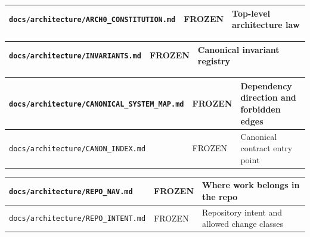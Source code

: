 \documentclass[9pt,a4paper,openany]{book}
\newcommand{\toprule}{\hline}
\newcommand{\midrule}{\hline}
\newcommand{\bottomrule}{\hline}
\begin{document}
\begin{center}
{\small\renewcommand{\arraystretch}{1.18}
\begin{tabularx}{\linewidth}{@{}>{\raggedright\arraybackslash}X >{\raggedright\arraybackslash}X >{\raggedright\arraybackslash}X@{}}
\toprule
\textbf{\texttt{docs/\allowbreak{}architecture/\allowbreak{}ARCH0\_\allowbreak{}CONSTITUTION.\allowbreak{}md}} & \textbf{FROZEN} & \textbf{Top-\allowbreak{}level architecture law} \\
\midrule
\bottomrule
\end{tabularx}
}
\end{center}


\begin{center}
{\small\renewcommand{\arraystretch}{1.18}
\begin{tabularx}{\linewidth}{@{}>{\raggedright\arraybackslash}X >{\raggedright\arraybackslash}X >{\raggedright\arraybackslash}X@{}}
\toprule
\textbf{\texttt{docs/\allowbreak{}architecture/\allowbreak{}INVARIANTS.\allowbreak{}md}} & \textbf{FROZEN} & \textbf{Canonical invariant registry} \\
\midrule
\bottomrule
\end{tabularx}
}
\end{center}


\begin{center}
{\small\renewcommand{\arraystretch}{1.18}
\begin{tabularx}{\linewidth}{@{}>{\raggedright\arraybackslash}X >{\raggedright\arraybackslash}X >{\raggedright\arraybackslash}X@{}}
\toprule
\textbf{\texttt{docs/\allowbreak{}architecture/\allowbreak{}CANONICAL\_\allowbreak{}SYSTEM\_\allowbreak{}MAP.\allowbreak{}md}} & \textbf{FROZEN} & \textbf{Dependency direction and forbidden edges} \\
\midrule
\texttt{docs/\allowbreak{}architecture/\allowbreak{}CANON\_\allowbreak{}INDEX.\allowbreak{}md} & FROZEN & Canonical contract entry point \\
\bottomrule
\end{tabularx}
}
\end{center}


\begin{center}
{\small\renewcommand{\arraystretch}{1.18}
\begin{tabularx}{\linewidth}{@{}>{\raggedright\arraybackslash}X >{\raggedright\arraybackslash}X >{\raggedright\arraybackslash}X@{}}
\toprule
\textbf{\texttt{docs/\allowbreak{}architecture/\allowbreak{}REPO\_\allowbreak{}NAV.\allowbreak{}md}} & \textbf{FROZEN} & \textbf{Where work belongs in the repo} \\
\midrule
\texttt{docs/\allowbreak{}architecture/\allowbreak{}REPO\_\allowbreak{}INTENT.\allowbreak{}md} & FROZEN & Repository intent and allowed change classes \\
\bottomrule
\end{tabularx}
}
\end{center}
\end{document}
